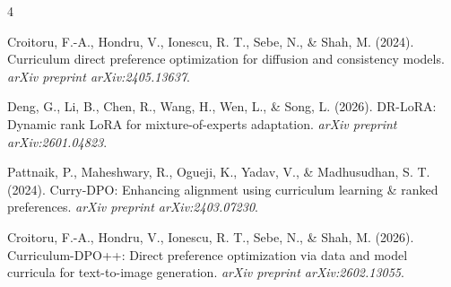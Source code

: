 \documentclass{article}
\begin{document}
\begin{thebibliography}{4}

Croitoru, F.-A., Hondru, V., Ionescu, R. T., Sebe, N., \& Shah, M. (2024). Curriculum direct preference optimization for diffusion and consistency models. {\it arXiv preprint arXiv:2405.13637}.

Deng, G., Li, B., Chen, R., Wang, H., Wen, L., \& Song, L. (2026). DR-LoRA: Dynamic rank LoRA for mixture-of-experts adaptation. {\it arXiv preprint arXiv:2601.04823}.

Pattnaik, P., Maheshwary, R., Ogueji, K., Yadav, V., \& Madhusudhan, S. T. (2024). Curry-DPO: Enhancing alignment using curriculum learning \& ranked preferences. {\it arXiv preprint arXiv:2403.07230}.

Croitoru, F.-A., Hondru, V., Ionescu, R. T., Sebe, N., \& Shah, M. (2026). Curriculum-DPO++: Direct preference optimization via data and model curricula for text-to-image generation. {\it arXiv preprint arXiv:2602.13055}.

\end{thebibliography}
\end{document}
